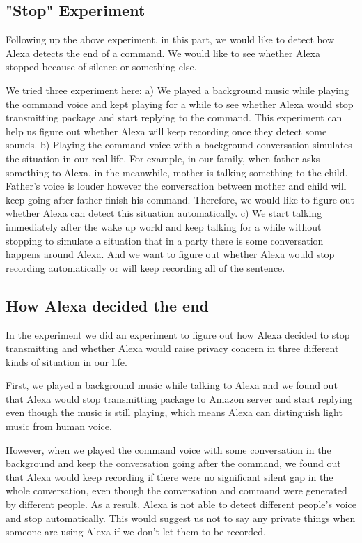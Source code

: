 \subsection{"Stop" Experiment}

Following up the above experiment, in this part, we would like to detect how Alexa detects the end of a command. We would like to see whether Alexa stopped because of silence or something else.

We tried three experiment here: a) We played a background music while playing the command voice and kept playing for a while to see whether Alexa would stop transmitting package and start replying to the command. This experiment can help us figure out whether Alexa will keep recording once they detect some sounds. b) Playing the command voice with a background conversation simulates the situation in our real life. For example, in our family, when father asks something to Alexa, in the meanwhile, mother is talking something to the child. Father's voice is louder however the conversation between mother and child will keep going after father finish his command. Therefore, we would like to figure out whether Alexa can detect this situation automatically. c) We start talking immediately after the wake up world and keep talking for a while without stopping to simulate a situation that in a party there is some conversation happens around Alexa. And we want to figure out whether Alexa would stop recording automatically or will keep recording all of the sentence.

\subsection{How Alexa decided the end}

In the experiment \todo{[3]} we did an experiment to figure out how Alexa decided to stop transmitting and whether Alexa would raise privacy concern in three different kinds of situation in our life.

First, we played a background music while talking to Alexa and we found out that Alexa would stop transmitting package to Amazon server and start replying even though the music is still playing, which means Alexa can distinguish light music from human voice.

However, when we played the command voice with some conversation in the background and keep the conversation going after the command, we found out that Alexa would keep recording if there were no significant silent gap in the whole conversation, even though the conversation and command were generated by different people. As a result, Alexa is not able to detect different people's voice and stop automatically. This would suggest us not to say any private things when someone are using Alexa if we don't let them to be recorded. 

